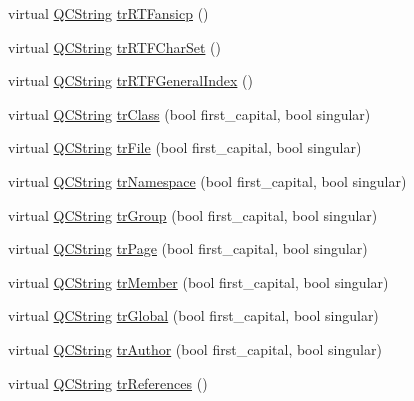 \begin{DoxyCompactItemize}
\item 
virtual \mbox{\hyperlink{class_q_c_string}{Q\+C\+String}} \mbox{\hyperlink{class_translator_portuguese_aebdebcd3a2bcbb38b22b98a7fc92af79}{tr\+R\+T\+Fansicp}} ()
\item 
virtual \mbox{\hyperlink{class_q_c_string}{Q\+C\+String}} \mbox{\hyperlink{class_translator_portuguese_a92a1e1d2fe9a64af40a2c7c65115b3ff}{tr\+R\+T\+F\+Char\+Set}} ()
\item 
virtual \mbox{\hyperlink{class_q_c_string}{Q\+C\+String}} \mbox{\hyperlink{class_translator_portuguese_a3c2b7185a3e8e2fb71458ebc8e605244}{tr\+R\+T\+F\+General\+Index}} ()
\item 
virtual \mbox{\hyperlink{class_q_c_string}{Q\+C\+String}} \mbox{\hyperlink{class_translator_portuguese_a1ddaefcba05eca18eec416694e02309b}{tr\+Class}} (bool first\+\_\+capital, bool singular)
\item 
virtual \mbox{\hyperlink{class_q_c_string}{Q\+C\+String}} \mbox{\hyperlink{class_translator_portuguese_acc79ac16678f5536de5757e5e94b1c88}{tr\+File}} (bool first\+\_\+capital, bool singular)
\item 
virtual \mbox{\hyperlink{class_q_c_string}{Q\+C\+String}} \mbox{\hyperlink{class_translator_portuguese_a9d758c550ae9d5fa29d79badcd0dab5b}{tr\+Namespace}} (bool first\+\_\+capital, bool singular)
\item 
virtual \mbox{\hyperlink{class_q_c_string}{Q\+C\+String}} \mbox{\hyperlink{class_translator_portuguese_ae0a58191f357edad54d3f37cf9626455}{tr\+Group}} (bool first\+\_\+capital, bool singular)
\item 
virtual \mbox{\hyperlink{class_q_c_string}{Q\+C\+String}} \mbox{\hyperlink{class_translator_portuguese_a27eeda494bdc419a1d5c1d39a2d1864c}{tr\+Page}} (bool first\+\_\+capital, bool singular)
\item 
virtual \mbox{\hyperlink{class_q_c_string}{Q\+C\+String}} \mbox{\hyperlink{class_translator_portuguese_afc3ce1ccaf2a1af687aed2f04c307547}{tr\+Member}} (bool first\+\_\+capital, bool singular)
\item 
virtual \mbox{\hyperlink{class_q_c_string}{Q\+C\+String}} \mbox{\hyperlink{class_translator_portuguese_a7141e5f23b1f3e2e37433cb41b513dcf}{tr\+Global}} (bool first\+\_\+capital, bool singular)
\item 
virtual \mbox{\hyperlink{class_q_c_string}{Q\+C\+String}} \mbox{\hyperlink{class_translator_portuguese_a9eb5a895d51570ce368e064746a6cc14}{tr\+Author}} (bool first\+\_\+capital, bool singular)
\item 
virtual \mbox{\hyperlink{class_q_c_string}{Q\+C\+String}} \mbox{\hyperlink{class_translator_portuguese_a17f6aa45e113272eda6e36c01ee99a7c}{tr\+References}} ()

\end{DoxyCompactItemize}
